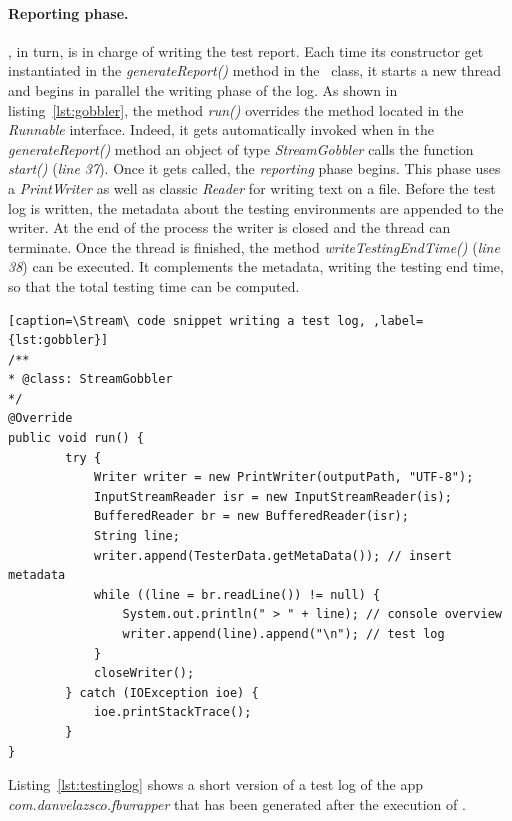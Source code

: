 \paragraph{Reporting phase.}
\Stream, in turn, is in charge of writing the test report. Each time its constructor get instantiated in the \textit{generateReport()} method in the \Cmd\ class, it starts a new thread and begins in parallel the writing phase of the log. 
As shown in listing~\ref{lst:gobbler}, the method \textit{run()} overrides the method located in the \textit{Runnable} interface. 
Indeed, it gets automatically invoked when in the \textit{generateReport()} method an object of type \textit{StreamGobbler} calls the function \textit{start()}  (\textit{line 37}). 
Once it gets called, the \textit{reporting} phase begins. This phase uses a \textit{PrintWriter} as well as classic \textit{Reader} for writing text on a file.
Before the test log is written, the metadata about the testing environments are appended to the writer. At the end of the process the writer is closed and the thread can terminate. Once the thread is finished, the method \textit{writeTestingEndTime()} (\textit{line 38}) can be executed.  
It complements the metadata, writing the testing end time, so that the total testing time can be computed. 





\begin{lstlisting}[caption=\Stream\ code snippet writing a test log, ,label={lst:gobbler}]
/**
* @class: StreamGobbler
*/
@Override
public void run() {
        try {
            Writer writer = new PrintWriter(outputPath, "UTF-8");
            InputStreamReader isr = new InputStreamReader(is);
            BufferedReader br = new BufferedReader(isr);
            String line;
            writer.append(TesterData.getMetaData()); // insert metadata
            while ((line = br.readLine()) != null) {
                System.out.println(" > " + line); // console overview
                writer.append(line).append("\n"); // test log 
            }
            closeWriter();
        } catch (IOException ioe) {
            ioe.printStackTrace();
        }
}
\end{lstlisting}

Listing~\ref{lst:testinglog} shows a short version of a test log of the app \textit{com.danvelazsco.fbwrapper} that has been generated after the execution of \monkey. 

